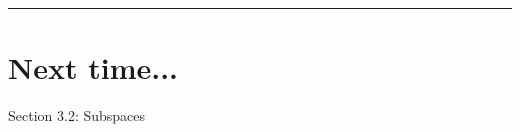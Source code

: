 \rule[0.01in]{\textwidth}{0.0025in}














	
	
 



\section*{Next time...}
Section 3.2: Subspaces

